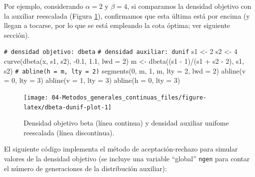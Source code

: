 \documentclass[
]{book}
\newenvironment{Shaded}{\begin{snugshade}}{\end{snugshade}}
\newcommand{\AttributeTok}[1]{\textcolor[rgb]{0.77,0.63,0.00}{#1}}
\newcommand{\CommentTok}[1]{\textcolor[rgb]{0.56,0.35,0.01}{\textit{#1}}}
\newcommand{\DecValTok}[1]{\textcolor[rgb]{0.00,0.00,0.81}{#1}}
\newcommand{\FloatTok}[1]{\textcolor[rgb]{0.00,0.00,0.81}{#1}}
\newcommand{\FunctionTok}[1]{\textcolor[rgb]{0.00,0.00,0.00}{#1}}
\newcommand{\NormalTok}[1]{#1}
\newcommand{\OtherTok}[1]{\textcolor[rgb]{0.56,0.35,0.01}{#1}}
\newcommand{\SpecialCharTok}[1]{\textcolor[rgb]{0.00,0.00,0.00}{#1}}
\theoremstyle{break}
\theoremstyle{nonumberplain}
\renewcommand{\CommentTok}[1]{\textcolor[rgb]{0.41,0.41,0.41}{\texttt{#1}}}
\begin{document}
Por ejemplo, considerando \(\alpha = 2\) y \(\beta = 4\), si comparamos la densidad objetivo con la auxiliar reescalada (Figura \ref{fig:dbeta-dunif-plot}), confirmamos que esta última está por encima (y llegan a tocarse, por lo que se está empleando la cota óptima; ver siguiente sección).

\begin{Shaded}
\begin{Highlighting}[]
\CommentTok{\# densidad objetivo: dbeta}
\CommentTok{\# densidad auxiliar: dunif}
\NormalTok{s1 }\OtherTok{\textless{}{-}} \DecValTok{2}
\NormalTok{s2 }\OtherTok{\textless{}{-}} \DecValTok{4}
\FunctionTok{curve}\NormalTok{(}\FunctionTok{dbeta}\NormalTok{(x, s1, s2), }\SpecialCharTok{{-}}\FloatTok{0.1}\NormalTok{, }\FloatTok{1.1}\NormalTok{, }\AttributeTok{lwd =} \DecValTok{2}\NormalTok{)}
\NormalTok{m }\OtherTok{\textless{}{-}} \FunctionTok{dbeta}\NormalTok{((s1 }\SpecialCharTok{{-}} \DecValTok{1}\NormalTok{)}\SpecialCharTok{/}\NormalTok{(s1 }\SpecialCharTok{+}\NormalTok{ s2 }\SpecialCharTok{{-}} \DecValTok{2}\NormalTok{), s1, s2)}
\CommentTok{\# abline(h = m, lty = 2)}
\FunctionTok{segments}\NormalTok{(}\DecValTok{0}\NormalTok{, m, }\DecValTok{1}\NormalTok{, m, }\AttributeTok{lty =} \DecValTok{2}\NormalTok{, }\AttributeTok{lwd =} \DecValTok{2}\NormalTok{)}
\FunctionTok{abline}\NormalTok{(}\AttributeTok{v =} \DecValTok{0}\NormalTok{, }\AttributeTok{lty =} \DecValTok{3}\NormalTok{)}
\FunctionTok{abline}\NormalTok{(}\AttributeTok{v =} \DecValTok{1}\NormalTok{, }\AttributeTok{lty =} \DecValTok{3}\NormalTok{)}
\FunctionTok{abline}\NormalTok{(}\AttributeTok{h =} \DecValTok{0}\NormalTok{, }\AttributeTok{lty =} \DecValTok{3}\NormalTok{)}
\end{Highlighting}
\end{Shaded}

\begin{figure}[!htb]

{\centering \texttt{[image: 04-Metodos\_generales\_continuas\_files/figure-latex/dbeta-dunif-plot-1]} 

}

\caption{Densidad objetivo beta (línea continua) y densidad auxiliar unifome reescalada (línea discontinua).}\label{fig:dbeta-dunif-plot}
\end{figure}

El siguiente código implementa el método de aceptación-rechazo para simular valores de la densidad objetivo (se incluye una variable ``global'' \texttt{ngen} para contar el número de generaciones de la distribución auxiliar):
\end{document}
